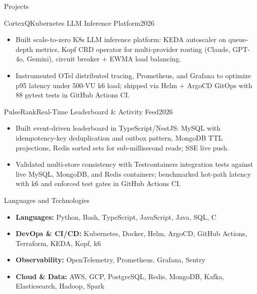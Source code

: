 \documentclass[]{mcdowellcv}
\begin{document}
\begin{cvsection}{Projects}
  \begin{cvsubsection}{CortexQ}{Kubernetes LLM Inference Platform}{2026}
    \begin{itemize}
      \item Built scale-to-zero K8s LLM inference platform: KEDA autoscaler on queue-depth metrics, Kopf CRD operator for multi-provider routing (Claude, GPT-4o, Gemini), circuit breaker + EWMA load balancing.
      \item Instrumented OTel distributed tracing, Prometheus, and Grafana to optimize p95 latency under 500-VU k6 load; shipped via Helm + ArgoCD GitOps with 88 pytest tests in GitHub Actions CI.
    \end{itemize}
    \vspace{-1.5pt}
  \end{cvsubsection}

  \begin{cvsubsection}{PulseRank}{Real-Time Leaderboard \& Activity Feed}{2026}
    \begin{itemize}
      \item Built event-driven leaderboard in TypeScript/NestJS: MySQL with idempotency-key deduplication and outbox pattern, MongoDB TTL projections, Redis sorted sets for sub-millisecond reads; SSE live push.
      \item Validated multi-store consistency with Testcontainers integration tests against live MySQL, MongoDB, and Redis containers; benchmarked hot-path latency with k6 and enforced test gates in GitHub Actions CI.
    \end{itemize}
  \end{cvsubsection}

\end{cvsection}

\begin{cvsection}{Languages and Technologies}
  \begin{cvsubsection}{}{}{}
    \begin{itemize}
      \item \textbf{Languages:} Python, Bash, TypeScript, JavaScript, Java, SQL, C
      \item \textbf{DevOps \& CI/CD:} Kubernetes, Docker, Helm, ArgoCD, GitHub Actions, Terraform, KEDA, Kopf, k6
      \item \textbf{Observability:} OpenTelemetry, Prometheus, Grafana, Sentry
      \item \textbf{Cloud \& Data:} AWS, GCP, PostgreSQL, Redis, MongoDB, Kafka, Elasticsearch, Hadoop, Spark
    \end{itemize}
  \end{cvsubsection}
\end{cvsection}
\end{document}
